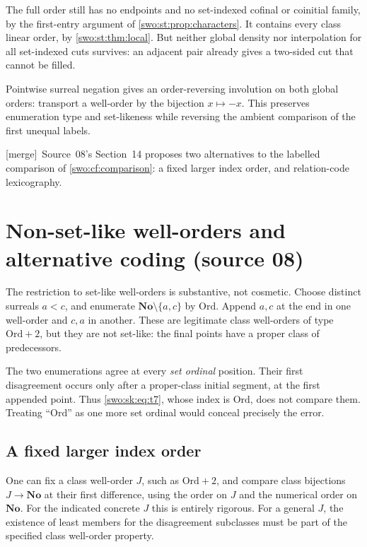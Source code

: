 \documentclass[11pt]{article}
\theoremstyle{definition}
\theoremstyle{remark}
\newcommand{\No}{\mathbf{No}}
\newcommand{\Ord}{\mathrm{Ord}}
\newcommand{\merge}{\textsf{[merge]}}
\begin{document}
The full order still has no endpoints and no set-indexed cofinal or
coinitial family, by the first-entry argument of
\cref{swo:st:prop:characters}. It contains every class linear order, by
\cref{swo:st:thm:local}. But neither global density nor interpolation for all
set-indexed cuts survives: an adjacent pair already gives a two-sided
cut that cannot be filled.

Pointwise surreal negation gives an order-reversing involution on both
global orders: transport a well-order by the bijection $x\mapsto -x$.
This preserves enumeration type and set-likeness while reversing the
ambient comparison of the first unequal labels.


\merge\ Source~08's Section~14 proposes two alternatives to the labelled
comparison of \cref{swo:cf:comparison}: a fixed larger index order, and
relation-code lexicography.

\section{Non-set-like well-orders and alternative coding (source 08)}\label{swo:sk:sec:nonsetlike}

The restriction to set-like well-orders is substantive, not cosmetic.
Choose distinct surreals $a<c$, and enumerate
$\No\setminus\{a,c\}$ by $\Ord$. Append $a,c$ at the end in one
well-order and $c,a$ in another. These are legitimate class
well-orders of type $\Ord+2$, but they are not set-like: the final
points have a proper class of predecessors.

The two enumerations agree at every \emph{set ordinal} position.
Their first disagreement occurs only after a proper-class initial
segment, at the first appended point. Thus \eqref{swo:sk:eq:t7}, whose index is
$\Ord$, does not compare them. Treating ``$\Ord$'' as one more set
ordinal would conceal precisely the error.

\subsection{A fixed larger index order}

One can fix a class well-order $J$, such as $\Ord+2$, and compare class
bijections $J\to\No$ at their first difference, using the order on $J$
and the numerical order on $\No$. For the indicated concrete $J$ this
is entirely rigorous. For a general $J$, the existence of least
members for the disagreement subclasses must be part of the specified
class well-order property.
\end{document}
